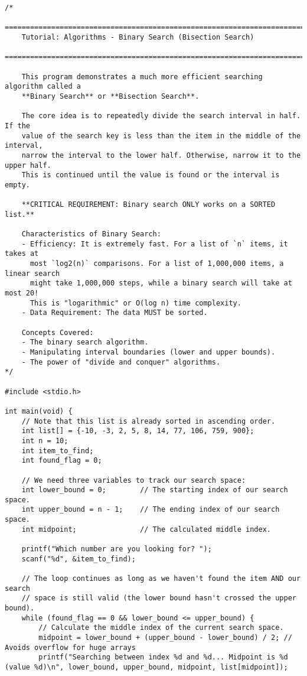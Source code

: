 \documentclass[11pt]{book}
\begin{document}
\begin{verbatim}
/*
    ================================================================================
    Tutorial: Algorithms - Binary Search (Bisection Search)
    ================================================================================

    This program demonstrates a much more efficient searching algorithm called a
    **Binary Search** or **Bisection Search**.

    The core idea is to repeatedly divide the search interval in half. If the
    value of the search key is less than the item in the middle of the interval,
    narrow the interval to the lower half. Otherwise, narrow it to the upper half.
    This is continued until the value is found or the interval is empty.

    **CRITICAL REQUIREMENT: Binary search ONLY works on a SORTED list.**

    Characteristics of Binary Search:
    - Efficiency: It is extremely fast. For a list of `n` items, it takes at
      most `log2(n)` comparisons. For a list of 1,000,000 items, a linear search
      might take 1,000,000 steps, while a binary search will take at most 20!
      This is "logarithmic" or O(log n) time complexity.
    - Data Requirement: The data MUST be sorted.

    Concepts Covered:
    - The binary search algorithm.
    - Manipulating interval boundaries (lower and upper bounds).
    - The power of "divide and conquer" algorithms.
*/

#include <stdio.h>

int main(void) {
    // Note that this list is already sorted in ascending order.
    int list[] = {-10, -3, 2, 5, 8, 14, 77, 106, 759, 900};
    int n = 10;
    int item_to_find;
    int found_flag = 0;

    // We need three variables to track our search space:
    int lower_bound = 0;        // The starting index of our search space.
    int upper_bound = n - 1;    // The ending index of our search space.
    int midpoint;               // The calculated middle index.

    printf("Which number are you looking for? ");
    scanf("%d", &item_to_find);

    // The loop continues as long as we haven't found the item AND our search
    // space is still valid (the lower bound hasn't crossed the upper bound).
    while (found_flag == 0 && lower_bound <= upper_bound) {
        // Calculate the middle index of the current search space.
        midpoint = lower_bound + (upper_bound - lower_bound) / 2; // Avoids overflow for huge arrays
        printf("Searching between index %d and %d... Midpoint is %d (value %d)\n", lower_bound, upper_bound, midpoint, list[midpoint]);


\end{verbatim}
\end{document}
